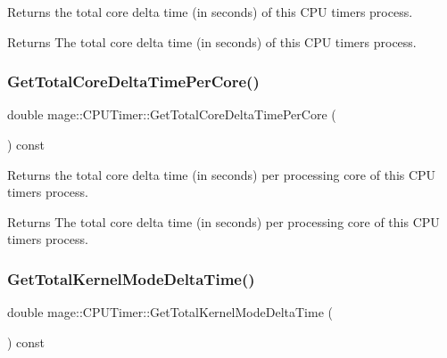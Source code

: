 Returns the total core delta time (in seconds) of this C\+PU timer\textquotesingle{}s process.

\begin{DoxyReturn}{Returns}
The total core delta time (in seconds) of this C\+PU timer\textquotesingle{}s process. 
\end{DoxyReturn}
\hypertarget{classmage_1_1_c_p_u_timer_af501e54e834f68469dd4a0f128f2da79}{}\label{classmage_1_1_c_p_u_timer_af501e54e834f68469dd4a0f128f2da79} 
\subsubsection{\texorpdfstring{Get\+Total\+Core\+Delta\+Time\+Per\+Core()}{GetTotalCoreDeltaTimePerCore()}}
{\footnotesize\ttfamily double mage\+::\+C\+P\+U\+Timer\+::\+Get\+Total\+Core\+Delta\+Time\+Per\+Core (\begin{DoxyParamCaption}{ }\end{DoxyParamCaption}) const}

Returns the total core delta time (in seconds) per processing core of this C\+PU timer\textquotesingle{}s process.

\begin{DoxyReturn}{Returns}
The total core delta time (in seconds) per processing core of this C\+PU timer\textquotesingle{}s process. 
\end{DoxyReturn}
\hypertarget{classmage_1_1_c_p_u_timer_aa9a1db98ad3d46674c733256dedff164}{}\label{classmage_1_1_c_p_u_timer_aa9a1db98ad3d46674c733256dedff164} 
\subsubsection{\texorpdfstring{Get\+Total\+Kernel\+Mode\+Delta\+Time()}{GetTotalKernelModeDeltaTime()}}
{\footnotesize\ttfamily double mage\+::\+C\+P\+U\+Timer\+::\+Get\+Total\+Kernel\+Mode\+Delta\+Time (\begin{DoxyParamCaption}{ }\end{DoxyParamCaption}) const}


